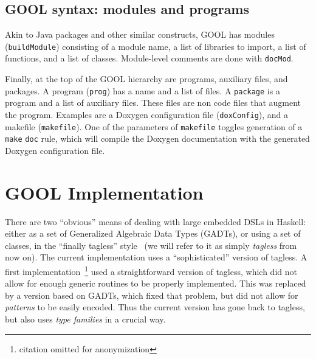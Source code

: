 \documentclass[sigplan,review,anonymous,prologue,dvipsnames]{acmart}
\newcommand{\Cplusplus}{C\texttt{++}}
\begin{document}
\subsection{GOOL syntax: modules and programs}

Akin to Java packages and other similar constructs, GOOL has modules
(\verb|buildModule|) consisting of a module name, a list of libraries to import,
a list of functions, and a list of classes. Module-level comments are done
with \verb|docMod|.

Finally, at the top of the GOOL hierarchy are programs, auxiliary files, and
packages. A program (\verb|prog|) has a name and a list of files.  A
\verb|package| is a program and a list of auxiliary files. These files are non
code files that augment the program. Examples are a Doxygen configuration file
(\verb|doxConfig|), and a makefile (\verb|makefile|).  One of the parameters of
\verb|makefile| toggles generation of a \verb|make| \verb|doc| rule, which will
compile the Doxygen documentation with the generated Doxygen configuration
file.

\section{GOOL Implementation} \label{sec:implementation}

There are two ``obvious'' means of dealing with large embedded DSLs in Haskell:
either as a set of Generalized Algebraic Data Types (GADTs), or using a set of
classes, in the ``finally tagless'' style~\cite{carette2009finally} (we will
refer to it as simply \emph{tagless} from now on).  The current implementation
uses a ``sophisticated'' version of tagless. A first
implementation~\footnote{citation omitted for anonymization} used a
straightforward version of tagless, which did not allow for enough generic
routines to be properly implemented.  This was replaced by a version based on
GADTs, which fixed that problem, but did not allow for \emph{patterns} to be
easily encoded. Thus the current version has gone back to tagless, but also uses
\emph{type families} in a crucial way.
\end{document}
